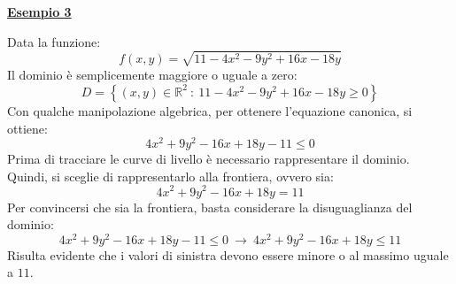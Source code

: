 \documentclass[a4paper]{article}
\newcommand{\example}[1]{\textcolor{Green4}{\textbf{#1}}}
\begin{document}
	\begin{flushleft}
		\example{\underline{Esempio 3}}
	\end{flushleft}
	Data la funzione:
	\begin{equation*}
		f\left(x,y\right) = \sqrt{11 - 4x^{2} - 9y^{2} + 16x - 18y}
	\end{equation*}
	Il dominio è semplicemente maggiore o uguale a zero:
	\begin{equation*}
		D = \left\{\left(x,y\right) \in \mathbb{R}^{2} \: : \: 11 - 4x^{2} - 9y^{2} + 16x - 18y \ge 0\right\}
	\end{equation*}
	Con qualche manipolazione algebrica, per ottenere l'equazione canonica, si ottiene:
	\begin{equation*}
		4x^{2} + 9y^{2} - 16x + 18y - 11 \le 0
	\end{equation*}
	Prima di tracciare le curve di livello è necessario rappresentare il dominio. Quindi, si sceglie di rappresentarlo alla frontiera, ovvero sia:
	\begin{equation*}
		4x^{2} + 9y^{2} - 16x + 18y = 11
	\end{equation*}
	Per convincersi che sia la frontiera, basta considerare la disuguaglianza del dominio:
	\begin{equation*}
		4x^{2} + 9y^{2} - 16x + 18y - 11 \le 0 \: \rightarrow \: 4x^{2} + 9y^{2} - 16x + 18y \le 11
	\end{equation*}
	Risulta evidente che i valori di sinistra devono essere minore o al massimo uguale a $11$.\newline
\end{document}
